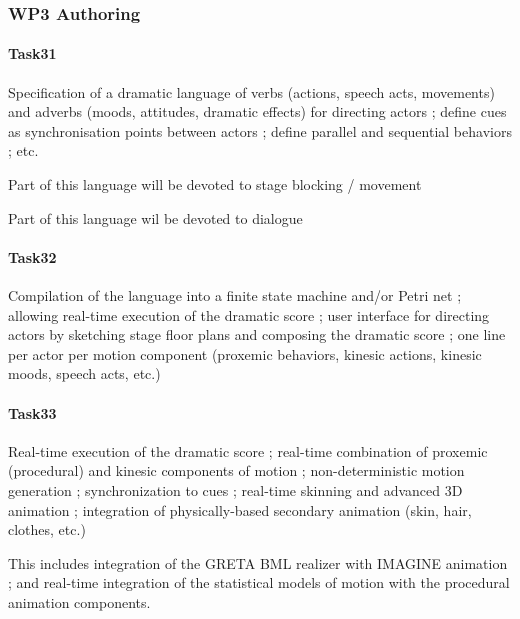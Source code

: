 
\subsubsection{WP3 Authoring}

\paragraph{Task31} Specification of a dramatic language of verbs (actions, speech acts, movements) and adverbs (moods, attitudes, dramatic effects) for directing actors ; define cues as synchronisation points between actors ; define parallel and sequential behaviors ; etc.

Part of this language will be devoted to stage blocking / movement

Part of this language wil be devoted to dialogue

\paragraph{Task32}  Compilation of the language into a finite state machine and/or Petri net ; allowing real-time execution of the dramatic score ; user interface for directing actors by sketching stage floor plans and composing the dramatic score ; one line per actor per motion component (proxemic behaviors, kinesic actions, kinesic moods, speech acts, etc.)

\paragraph{Task33} Real-time execution of the dramatic score ; real-time combination of proxemic (procedural) and kinesic components of motion ; non-deterministic motion generation ; synchronization to cues ; real-time skinning and advanced 3D animation ; integration of physically-based secondary animation (skin, hair, clothes, etc.)

This includes integration of the GRETA BML realizer with IMAGINE animation ; and real-time integration of the statistical models of motion with the procedural animation components.

\endinput
